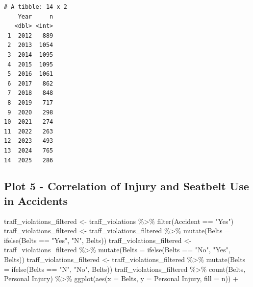 \documentclass[
  letterpaper,
  DIV=11,
  numbers=noendperiod]{scrartcl}
\newenvironment{Shaded}{\begin{snugshade}}{\end{snugshade}}
\newcommand{\AttributeTok}[1]{\textcolor[rgb]{0.40,0.45,0.13}{#1}}
\newcommand{\FunctionTok}[1]{\textcolor[rgb]{0.28,0.35,0.67}{#1}}
\newcommand{\NormalTok}[1]{\textcolor[rgb]{0.00,0.23,0.31}{#1}}
\newcommand{\OtherTok}[1]{\textcolor[rgb]{0.00,0.23,0.31}{#1}}
\newcommand{\SpecialCharTok}[1]{\textcolor[rgb]{0.37,0.37,0.37}{#1}}
\newcommand{\StringTok}[1]{\textcolor[rgb]{0.13,0.47,0.30}{#1}}
\begin{document}
\begin{verbatim}
# A tibble: 14 x 2
    Year     n
   <dbl> <int>
 1  2012   889
 2  2013  1054
 3  2014  1095
 4  2015  1095
 5  2016  1061
 6  2017   862
 7  2018   848
 8  2019   717
 9  2020   298
10  2021   274
11  2022   263
12  2023   493
13  2024   765
14  2025   286
\end{verbatim}

\subsection{Plot 5 - Correlation of Injury and Seatbelt Use in
Accidents}\label{plot-5---correlation-of-injury-and-seatbelt-use-in-accidents}

\begin{Shaded}
\begin{Highlighting}[]
\NormalTok{traff\_violations\_filtered }\OtherTok{\textless{}{-}}\NormalTok{ traff\_violations }\SpecialCharTok{\%\textgreater{}\%} \FunctionTok{filter}\NormalTok{(Accident }\SpecialCharTok{==} \StringTok{"Yes"}\NormalTok{)}
\NormalTok{traff\_violations\_filtered }\OtherTok{\textless{}{-}}\NormalTok{ traff\_violations\_filtered }\SpecialCharTok{\%\textgreater{}\%}
  \FunctionTok{mutate}\NormalTok{(}\AttributeTok{Belts =} \FunctionTok{ifelse}\NormalTok{(Belts }\SpecialCharTok{==} \StringTok{"Yes"}\NormalTok{, }\StringTok{"N"}\NormalTok{, Belts))}
\NormalTok{traff\_violations\_filtered }\OtherTok{\textless{}{-}}\NormalTok{ traff\_violations\_filtered }\SpecialCharTok{\%\textgreater{}\%}
  \FunctionTok{mutate}\NormalTok{(}\AttributeTok{Belts =} \FunctionTok{ifelse}\NormalTok{(Belts }\SpecialCharTok{==} \StringTok{"No"}\NormalTok{, }\StringTok{"Yes"}\NormalTok{, Belts))}
\NormalTok{traff\_violations\_filtered }\OtherTok{\textless{}{-}}\NormalTok{ traff\_violations\_filtered }\SpecialCharTok{\%\textgreater{}\%}
  \FunctionTok{mutate}\NormalTok{(}\AttributeTok{Belts =} \FunctionTok{ifelse}\NormalTok{(Belts }\SpecialCharTok{==} \StringTok{"N"}\NormalTok{, }\StringTok{"No"}\NormalTok{, Belts))}
\NormalTok{traff\_violations\_filtered }\SpecialCharTok{\%\textgreater{}\%} 
  \FunctionTok{count}\NormalTok{(}\StringTok{\textasciigrave{}}\AttributeTok{Belts}\StringTok{\textasciigrave{}}\NormalTok{, }\StringTok{\textasciigrave{}}\AttributeTok{Personal Injury}\StringTok{\textasciigrave{}}\NormalTok{) }\SpecialCharTok{\%\textgreater{}\%}
  \FunctionTok{ggplot}\NormalTok{(}\FunctionTok{aes}\NormalTok{(}\AttributeTok{x =} \StringTok{\textasciigrave{}}\AttributeTok{Belts}\StringTok{\textasciigrave{}}\NormalTok{, }\AttributeTok{y =} \StringTok{\textasciigrave{}}\AttributeTok{Personal Injury}\StringTok{\textasciigrave{}}\NormalTok{, }\AttributeTok{fill =}\NormalTok{ n)) }\SpecialCharTok{+}

\end{Highlighting}
\end{Shaded}
\end{document}
